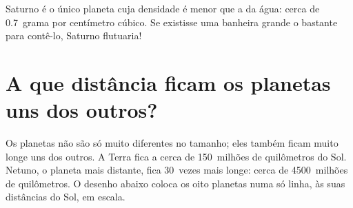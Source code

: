 \begin{remark}\label{rem:g6:earth-a-planet:saturn}
Saturno é o único planeta cuja densidade é menor que a da água: cerca de
0.7~grama por centímetro cúbico. Se existisse uma banheira grande o
bastante para contê-lo, Saturno flutuaria!
\end{remark}

\section{A que distância ficam os planetas uns dos outros?}

Os planetas não são só muito diferentes no tamanho; eles também ficam muito
longe uns dos outros. A Terra fica a cerca de 150~milhões de quilômetros do
Sol. Netuno, o planeta mais distante, fica 30~vezes mais longe: cerca de
4500~milhões de quilômetros. O desenho abaixo coloca os oito planetas numa
só linha, às suas distâncias do Sol, em escala.

